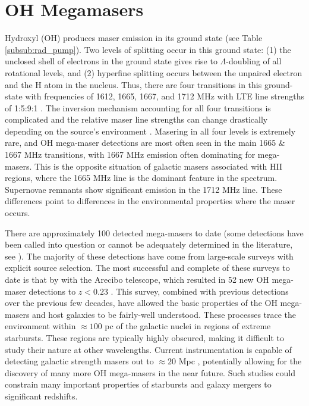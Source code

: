 \section{OH Megamasers}
\label{sec:OH}

Hydroxyl (OH) produces maser emission in its ground state (see Table \ref{subsub:rad_pump}). Two levels of splitting occur in this ground state: (1) the unclosed shell of electrons in the ground state gives rise to $\Lambda$-doubling of all rotational levels, and (2) hyperfine splitting occurs between the unpaired electron and the H atom in the nucleus. Thus, there are four transitions in this ground-state with frequencies of 1612, 1665, 1667, and 1712 MHz with LTE line strengths of 1:5:9:1 \cite{lo2005}. The inversion mechanism accounting for all four transitions is complicated \citep{Elitzur_1992} and the relative maser line strengths can change drastically depending on the source's environment \citep{lo2005}. Masering in all four levels is extremely rare, and OH mega-maser detections are most often seen in the main 1665 \& 1667 MHz transitions, with 1667 MHz emission often dominating for mega-masers. This is the opposite situation of galactic masers associated with HII regions, where the 1665 MHz line is the dominant feature in the spectrum. Supernovae remnants show significant emission in the 1712 MHz line. These differences point to differences in the environmental properties where the maser occurs. 

There are approximately 100 detected mega-masers to date (some detections have been called into question or cannot be adequately determined in the literature, see \citet{darling2002_paperIII}). The majority of these detections have come from large-scale surveys with explicit source selection. The most successful and complete of these surveys to date is that by \citet{darling_2000_paperI} with the Arecibo telescope, which resulted in 52 new OH mega-maser detections to $z<0.23$ \citep{darling2002_paperIII}. This survey, combined with previous detections over the previous few decades, have allowed the basic properties of the OH mega-masers and host galaxies to be fairly-well understood. These processes trace the environment within $\approx 100$ pc of the galactic nuclei in regions of extreme starbursts. These regions are typically highly obscured, making it difficult to study their nature at other wavelengths.  Current instrumentation is capable of detecting galactic strength masers out to $\approx 20$ Mpc \citep{darling2012}, potentially allowing for the discovery of many more OH mega-masers in the near future. Such studies could constrain many important properties of starbursts and galaxy mergers to significant redshifts.


